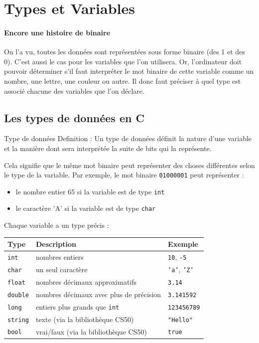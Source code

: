 \section{Types et Variables}
\paragraph{Encore une histoire de binaire}
	On l'a vu, toutes les données sont représentées sous forme binaire (des 1 et des 0). C'est aussi le cas pour les variables que l'on utilisera.
	Or, l'ordinateur doit pouvoir déterminer s'il faut interpréter le mot binaire de cette variable comme un nombre, une lettre, une couleur ou autre.
	Il donc faut préciser à quel type est associé chacune des variables que l'on déclare.

\subsection{Les types de données en C}
\begin{UPSTIinfor}{Type de données}
	Definition : Un type de données définit la nature d'une variable et la manière dont sera interprétée la suite de bits qui la représente.

	Cela signifie que le même mot binaire peut représenter des choses différentes selon le type de la variable. Par exemple, le mot binaire \texttt{01000001} peut représenter :
	\begin{itemize}
		\item le nombre entier 65 si la variable est de type \texttt{int}
		\item le caractère 'A' si la variable est de type \texttt{char}
	\end{itemize}
\end{UPSTIinfor}
Chaque variable a un type précis :
\begin{center}
	\begin{tabular}{|l|l|l|}
		\hline
		Type            & Description                             & Exemple                    \\
		\hline
		\texttt{int}    & nombres entiers                         & \texttt{10}, \texttt{-5}   \\
		\texttt{char}   & un seul caractère                       & \texttt{'a'}, \texttt{'Z'} \\
		\texttt{float}  & nombres décimaux approximatifs          & \texttt{3.14}              \\
		\texttt{double} & nombres décimaux avec plus de précision & \texttt{3.141592}          \\
		\texttt{long}   & entiers plus grands que \texttt{int}    & \texttt{123456789}         \\
		\texttt{string} & texte (via la bibliothèque CS50)        & \texttt{"Hello"}           \\
		\texttt{bool}   & vrai/faux (via la bibliothèque CS50)    & \texttt{true}              \\
		\hline
	\end{tabular}
\end{center}
